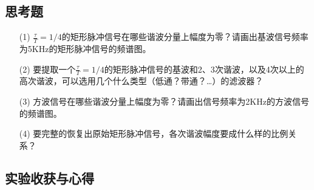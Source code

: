 \documentclass{article}
\begin{document}
	\subsection{{\heiti{}思考题}}
	\begin{enumerate}
		\item[(1)] $\frac{\tau}{T}=1/4$的矩形脉冲信号在哪些谐波分量上幅度为零？请画出基波信号频率为5KHz的矩形脉冲信号的频谱图。
		\item[(2)] 要提取一个$\frac{\tau}{T}=1/4$的矩形脉冲信号的基波和2、3次谐波，以及4次以上的高次谐波，可以选用几个什么类型（低通？带通？…）的滤波器？
		\item[(3)] 方波信号在哪些谐波分量上幅度为零？请画出信号频率为2KHz的方波信号的频谱图。
		\item[(4)] 要完整的恢复出原始矩形脉冲信号，各次谐波幅度要成什么样的比例关系？
	\end{enumerate}
	\subsection{{\heiti{}实验收获与心得}}
\end{document}
